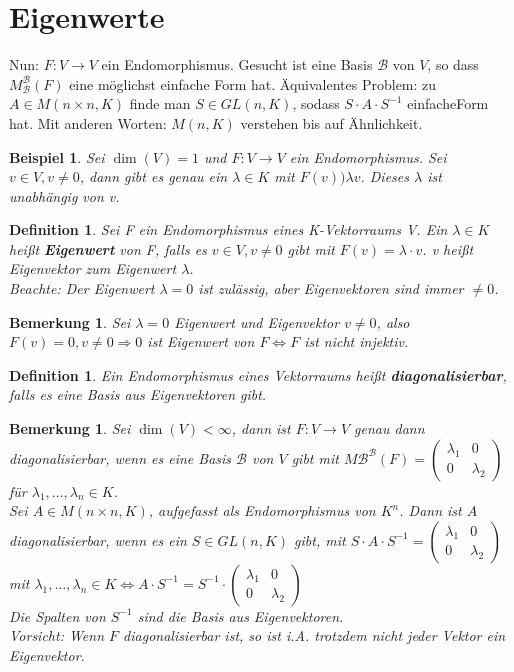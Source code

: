 \documentclass[12pt,a4paper]{article}
\theoremstyle{plain}
\newtheorem{Definition}[Theorem]{Definition}
\newtheorem{Bemerkung}[Theorem]{Bemerkung}
\newtheorem{Beispiel}[Theorem]{Beispiel}
\newcommand{\herv}[1]{{\emph{\textbf{#1}}}}
\numberwithin{equation}{section}
\begin{document}
\section{Eigenwerte}
Nun: $F: V \rightarrow V$ ein Endomorphismus. Gesucht ist eine Basis $\mathcal{B}$ von $V$, so dass $M^{\mathcal{B}}_\mathcal{B}(F)$ eine möglichst einfache Form hat. Äquivalentes Problem: zu $A\in M(n\times n,K)$ finde man $S\in GL(n,K)$, sodass $S\cdot A\cdot S^{-1}$ \glqq einfache\grqq Form hat. Mit anderen Worten: $M(n,K)$ verstehen bis auf Ähnlichkeit.
\begin{Beispiel} Sei $\dim(V)=1$ und $F:V\rightarrow V$ ein Endomorphismus. Sei $v\in V, v\neq 0$, dann gibt es genau ein $\lambda \in K$ mit $F(v))\lambda v$. Dieses $\lambda$ ist unabhängig von v.
\end{Beispiel}
\begin{Definition} Sei F ein Endomorphismus eines K-Vektorraums V. Ein $\lambda\in K$ heißt \herv{Eigenwert} von F, falls es $v\in V, v\neq 0$ gibt mit $F(v)=\lambda \cdot v$. v heißt Eigenvektor zum Eigenwert $\lambda$.\\
Beachte: Der Eigenwert $\lambda=0$ ist zulässig, aber Eigenvektoren sind immer $\neq 0$.
\end{Definition}
\begin{Bemerkung}
Sei $\lambda=0$ Eigenwert und Eigenvektor $v\neq 0$, also $F(v)=0, v\neq 0\Rightarrow 0$ ist Eigenwert von $F \Leftrightarrow F$ ist nicht injektiv.   
\end{Bemerkung}
\begin{Definition}
Ein Endomorphismus eines Vektorraums heißt \herv{diagonalisierbar}, falls es eine Basis aus Eigenvektoren gibt.
\end{Definition}
\begin{Bemerkung}
Sei $\dim(V)<\infty$, dann ist $F:V\rightarrow V$ genau dann diagonalisierbar, wenn es eine Basis $\mathcal{B}$ von $V$ gibt mit $M\mathcal{B}^\mathcal{B}(F)=\begin{pmatrix}
\lambda_1 & 0 \\ 0 & \lambda_2 \end{pmatrix}$ für $\lambda_1,\ldots,\lambda_n\in K$. \\
Sei $A\in M(n\times n, K)$, aufgefasst als Endomorphismus von $K^n$. Dann ist $A$ diagonalisierbar, wenn es ein $S\in GL(n,K)$ gibt, mit  $S\cdot A\cdot S^{-1} = \begin{pmatrix}
\lambda_1 & 0 \\ 0 &\lambda_2 \end{pmatrix}$ mit $\lambda_1,\ldots,\lambda_n \in K \Leftrightarrow A\cdot S^{-1} = S^{-1}\cdot\begin{pmatrix} \lambda_1 & 0 \\ 0 &\lambda_2 \end{pmatrix}$ \\
Die Spalten von $S^{-1}$ sind die Basis aus Eigenvektoren. \\
Vorsicht: Wenn $F$ diagonalisierbar ist, so ist i.A. trotzdem nicht jeder Vektor ein Eigenvektor.
\end{Bemerkung}
\end{document}
